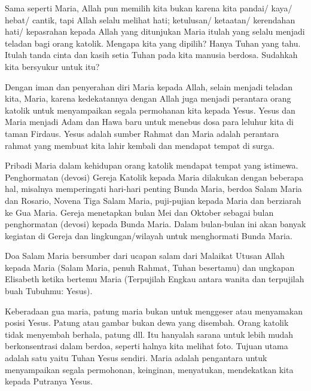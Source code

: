 Sama seperti Maria, Allah pun memilih kita bukan karena kita pandai/ kaya/ hebat/ cantik, tapi Allah selalu melihat hati; ketulusan/ ketaatan/ kerendahan hati/ kepasrahan kepada Allah yang ditunjukan Maria itulah yang selalu menjadi teladan bagi orang katolik. Mengapa kita yang dipilih? Hanya Tuhan yang tahu. Itulah tanda cinta dan kasih setia Tuhan pada kita manusia berdosa. Sudahkah kita bersyukur untuk itu?

Dengan iman dan penyerahan diri Maria kepada Allah, selain menjadi teladan kita, Maria, karena kedekatannya dengan Allah juga menjadi perantara orang katolik untuk menyampaikan segala permohanan kita kepada Yesus. Yesus dan Maria menjadi Adam dan Hawa baru untuk menebus dosa para leluhur kita di taman Firdaus. Yesus adalah sumber Rahmat dan Maria adalah perantara rahmat yang membuat kita lahir kembali dan mendapat tempat di surga.

Pribadi Maria dalam kehidupan orang katolik mendapat tempat yang istimewa. Penghormatan (devosi) Gereja Katolik kepada Maria dilakukan dengan beberapa hal, misalnya memperingati hari-hari penting Bunda Maria, berdoa Salam Maria dan Rosario, Novena Tiga Salam Maria, puji-pujian kepada Maria dan berziarah ke Gua Maria. Gereja menetapkan bulan Mei dan Oktober sebagai bulan penghormatan (devosi) kepada Bunda Maria. Dalam bulan-bulan ini akan banyak kegiatan di Gereja dan lingkungan/wilayah untuk menghormati Bunda Maria.

Doa Salam Maria bersumber dari ucapan salam dari Malaikat Utusan Allah kepada Maria (Salam Maria, penuh Rahmat, Tuhan besertamu) dan ungkapan Elisabeth ketika bertemu Maria (Terpujilah Engkau antara wanita dan terpujilah buah Tubuhmu: Yesus).

Keberadaan gua maria, patung maria bukan untuk menggeser atau menyamakan posisi Yesus. Patung atau gambar bukan dewa yang disembah. Orang katolik tidak menyembah berhala, patung dll. Itu hanyalah sarana untuk lebih mudah berkonsentrasi dalam berdoa, seperti halnya kita melihat foto. Tujuan utama adalah satu yaitu Tuhan Yesus sendiri. Maria adalah pengantara untuk menyampaikan segala permohonan, keinginan, menyatukan, mendekatkan kita kepada Putranya Yesus.